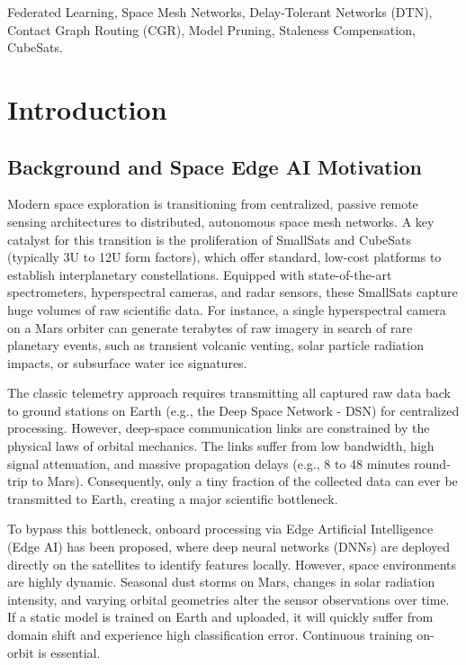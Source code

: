 \documentclass[journal,twocolumn]{IEEEtran}
\begin{document}
\begin{IEEEkeywords}
Federated Learning, Space Mesh Networks, Delay-Tolerant Networks (DTN), Contact Graph Routing (CGR), Model Pruning, Staleness Compensation, CubeSats.
\end{IEEEkeywords}

\section{Introduction}
\label{sec:intro}

\subsection{Background and Space Edge AI Motivation}
Modern space exploration is transitioning from centralized, passive remote sensing architectures to distributed, autonomous space mesh networks. A key catalyst for this transition is the proliferation of SmallSats and CubeSats (typically 3U to 12U form factors), which offer standard, low-cost platforms to establish interplanetary constellations. Equipped with state-of-the-art spectrometers, hyperspectral cameras, and radar sensors, these SmallSats capture huge volumes of raw scientific data. For instance, a single hyperspectral camera on a Mars orbiter can generate terabytes of raw imagery in search of rare planetary events, such as transient volcanic venting, solar particle radiation impacts, or subsurface water ice signatures.

The classic telemetry approach requires transmitting all captured raw data back to ground stations on Earth (e.g., the Deep Space Network - DSN) for centralized processing. However, deep-space communication links are constrained by the physical laws of orbital mechanics. The links suffer from low bandwidth, high signal attenuation, and massive propagation delays (e.g., 8 to 48 minutes round-trip to Mars). Consequently, only a tiny fraction of the collected data can ever be transmitted to Earth, creating a major scientific bottleneck. 

To bypass this bottleneck, onboard processing via Edge Artificial Intelligence (Edge AI) has been proposed, where deep neural networks (DNNs) are deployed directly on the satellites to identify features locally. However, space environments are highly dynamic. Seasonal dust storms on Mars, changes in solar radiation intensity, and varying orbital geometries alter the sensor observations over time. If a static model is trained on Earth and uploaded, it will quickly suffer from domain shift and experience high classification error. Continuous training on-orbit is essential.
\end{document}
